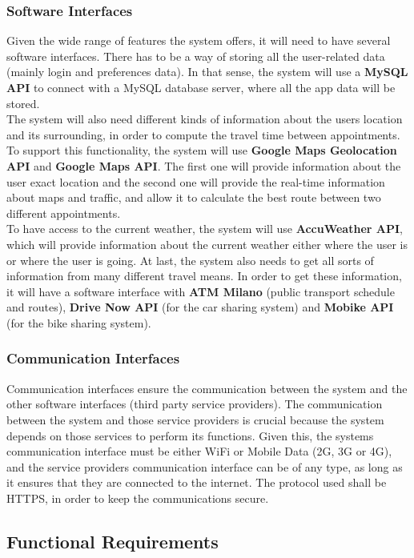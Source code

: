 \documentclass[12pt]{article}
\begin{document}
\subsubsection{Software Interfaces}
Given the wide range of features the system offers, it will need to have several software interfaces. There has to be a way of storing all the user-related data (mainly login and preferences data). In that sense, the system will use a \textbf{MySQL API} to connect with a MySQL database server, where all the app data will be stored.\\
The system will also need different kinds of information about the users location and its surrounding, in order to compute the travel time between appointments. To support this functionality, the system will use \textbf{Google Maps Geolocation API} and \textbf{Google Maps API}. The first one will provide information about the user exact location and the second one will provide the real-time information about maps and traffic, and allow it to calculate the best route between two different appointments.\\
To have access to the current weather, the system will use \textbf{AccuWeather API}, which will provide information about the current weather either where the user is or where the user is going.
At last, the system also needs to get all sorts of information from many different travel means. In order to get these information, it will have a software interface with \textbf{ATM Milano} (public transport schedule and routes), \textbf{Drive Now API} (for the car sharing system) and \textbf{Mobike API} (for the bike sharing system).



\subsubsection{Communication Interfaces}
Communication interfaces ensure the communication between the system and the other software interfaces (third party service providers).
The communication between the system and those service providers is crucial because the system depends on those services to perform its functions. Given this, the systems communication interface must be either WiFi or Mobile Data (2G, 3G or 4G), and the service providers communication interface can be of any type, as long as it ensures that they are connected to the internet. The protocol used shall be HTTPS, in order to keep the communications secure.

\subsection{Functional Requirements}
\end{document}
